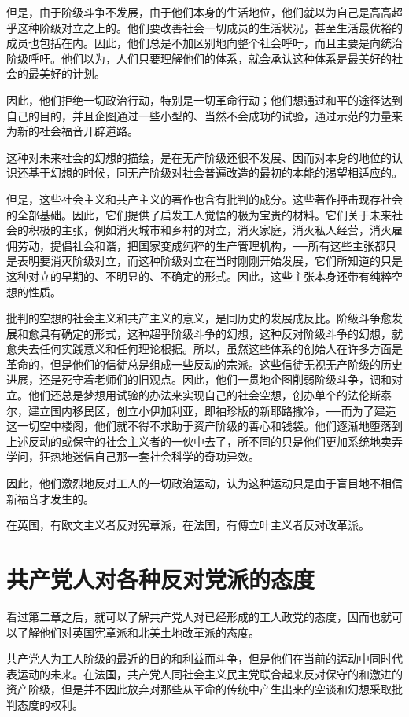 \documentclass[UTF8]{ctexart}
\begin{document}
但是，由于阶级斗争不发展，由于他们本身的生活地位，他们就以为自己是高高超乎这种阶级对立之上的。他们要改善社会一切成员的生活状况，甚至生活最优裕的成员也包括在内。因此，他们总是不加区别地向整个社会呼吁，而且主要是向统治阶级呼吁。他们以为，人们只要理解他们的体系，就会承认这种体系是最美好的社会的最美好的计划。

因此，他们拒绝一切政治行动，特别是一切革命行动；他们想通过和平的途径达到自己的目的，并且企图通过一些小型的、当然不会成功的试验，通过示范的力量来为新的社会福音开辟道路。

这种对未来社会的幻想的描绘，是在无产阶级还很不发展、因而对本身的地位的认识还基于幻想的时候，同无产阶级对社会普遍改造的最初的本能的渴望相适应的。

但是，这些社会主义和共产主义的著作也含有批判的成分。这些著作抨击现存社会的全部基础。因此，它们提供了启发工人觉悟的极为宝贵的材料。它们关于未来社会的积极的主张，例如消灭城市和乡村的对立，消灭家庭，消灭私人经营，消灭雇佣劳动，提倡社会和谐，把国家变成纯粹的生产管理机构，──所有这些主张都只是表明要消灭阶级对立，而这种阶级对立在当时刚刚开始发展，它们所知道的只是这种对立的早期的、不明显的、不确定的形式。因此，这些主张本身还带有纯粹空想的性质。

批判的空想的社会主义和共产主义的意义，是同历史的发展成反比。阶级斗争愈发展和愈具有确定的形式，这种超乎阶级斗争的幻想，这种反对阶级斗争的幻想，就愈失去任何实践意义和任何理论根据。所以，虽然这些体系的创始人在许多方面是革命的，但是他们的信徒总是组成一些反动的宗派。这些信徒无视无产阶级的历史进展，还是死守着老师们的旧观点。因此，他们一贯地企图削弱阶级斗争，调和对立。他们还总是梦想用试验的办法来实现自己的社会空想，创办单个的法伦斯泰尔，建立国内移民区，创立小伊加利亚，即袖珍版的新耶路撒冷，──而为了建造这一切空中楼阁，他们就不得不求助于资产阶级的善心和钱袋。他们逐渐地堕落到上述反动的或保守的社会主义者的一伙中去了，所不同的只是他们更加系统地卖弄学问，狂热地迷信自己那一套社会科学的奇功异效。

因此，他们激烈地反对工人的一切政治运动，认为这种运动只是由于盲目地不相信新福音才发生的。

在英国，有欧文主义者反对宪章派，在法国，有傅立叶主义者反对改革派。
\section{共产党人对各种反对党派的态度}
看过第二章之后，就可以了解共产党人对已经形成的工人政党的态度，因而也就可以了解他们对英国宪章派和北美土地改革派的态度。

共产党人为工人阶级的最近的目的和利益而斗争，但是他们在当前的运动中同时代表运动的未来。在法国，共产党人同社会主义民主党联合起来反对保守的和激进的资产阶级，但是并不因此放弃对那些从革命的传统中产生出来的空谈和幻想采取批判态度的权利。
\end{document}
